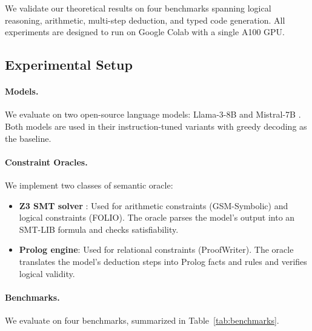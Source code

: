 \documentclass[twoside,11pt]{article}
\begin{document}

We validate our theoretical results on four benchmarks spanning logical
reasoning, arithmetic, multi-step deduction, and typed code generation. All
experiments are designed to run on Google Colab with a single A100 GPU.

\subsection{Experimental Setup}
\label{sec:exp-setup}

\paragraph{Models.} We evaluate on two open-source language models:
Llama-3-8B \citep{touvron2023llama} and Mistral-7B
\citep{jiang2023mistral}. Both models are used in their instruction-tuned
variants with greedy decoding as the baseline.

\paragraph{Constraint Oracles.} We implement two classes of semantic oracle:
\begin{itemize}
    \item \textbf{Z3 SMT solver} \citep{demoura2008z3}: Used for
    arithmetic constraints (GSM-Symbolic) and logical constraints (FOLIO).
    The oracle parses the model's output into an SMT-LIB formula and
    checks satisfiability.
    \item \textbf{Prolog engine}: Used for relational constraints
    (ProofWriter). The oracle translates the model's deduction steps into
    Prolog facts and rules and verifies logical validity.
\end{itemize}

\paragraph{Benchmarks.} We evaluate on four benchmarks, summarized in
Table~\ref{tab:benchmarks}.
\end{document}
